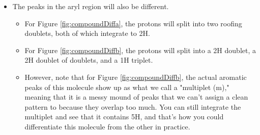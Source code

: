 \documentclass[../notes.tex]{subfiles}
\begin{document}
\begin{itemize}
\begin{itemize}
\begin{itemize}
\begin{itemize}
            \end{itemize}
            \item The peaks in the aryl region will also be different.
            \begin{itemize}
                \item For Figure \ref{fig:compoundDiffa}, the protons will split into two roofing doublets, both of which integrate to 2H.
                \item For Figure \ref{fig:compoundDiffb}, the protons will split into a 2H doublet, a 2H doublet of doublets, and a 1H triplet.
                \item However, note that for Figure \ref{fig:compoundDiffb}, the actual aromatic peaks of this molecule show up as what we call a "multiplet (m)," meaning that it is a messy mound of peaks that we can't assign a clean pattern to because they overlap too much. You can still integrate the multiplet and see that it contains 5H, and that's how you could differentiate this molecule from the other in practice.
            \end{itemize}
        \end{itemize}
    \end{itemize}
\end{itemize}
\end{document}
